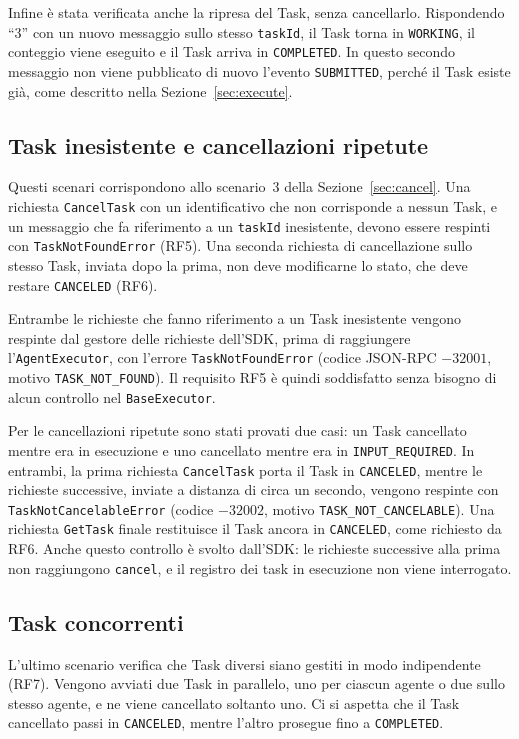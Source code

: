 Infine è stata verificata anche la ripresa del Task, senza cancellarlo. Rispondendo ``3'' con un nuovo messaggio sullo stesso \texttt{taskId}, il Task torna in \texttt{WORKING}, il conteggio viene eseguito e il Task arriva in \texttt{COMPLETED}. In questo secondo messaggio non viene pubblicato di nuovo l'evento \texttt{SUBMITTED}, perché il Task esiste già, come descritto nella Sezione~\ref{sec:execute}.

\subsection{Task inesistente e cancellazioni ripetute}

Questi scenari corrispondono allo scenario~3 della Sezione~\ref{sec:cancel}. Una richiesta \texttt{CancelTask} con un identificativo che non corrisponde a nessun Task, e un messaggio che fa riferimento a un \texttt{taskId} inesistente, devono essere respinti con \texttt{TaskNotFoundError} (RF5). Una seconda richiesta di cancellazione sullo stesso Task, inviata dopo la prima, non deve modificarne lo stato, che deve restare \texttt{CANCELED} (RF6).

Entrambe le richieste che fanno riferimento a un Task inesistente vengono respinte dal gestore delle richieste dell'SDK, prima di raggiungere l'\texttt{AgentExecutor}, con l'errore \texttt{TaskNotFoundError} (codice JSON-RPC $-32001$, motivo \texttt{TASK\_NOT\_FOUND}). Il requisito RF5 è quindi soddisfatto senza bisogno di alcun controllo nel \texttt{BaseExecutor}.

Per le cancellazioni ripetute sono stati provati due casi: un Task cancellato mentre era in esecuzione e uno cancellato mentre era in \texttt{INPUT\_REQUIRED}. In entrambi, la prima richiesta \texttt{CancelTask} porta il Task in \texttt{CANCELED}, mentre le richieste successive, inviate a distanza di circa un secondo, vengono respinte con \texttt{TaskNotCancelableError} (codice $-32002$, motivo \texttt{TASK\_NOT\_CANCELABLE}). Una richiesta \texttt{GetTask} finale restituisce il Task ancora in \texttt{CANCELED}, come richiesto da RF6. Anche questo controllo è svolto dall'SDK: le richieste successive alla prima non raggiungono \texttt{cancel}, e il registro dei task in esecuzione non viene interrogato.

\subsection{Task concorrenti}

L'ultimo scenario verifica che Task diversi siano gestiti in modo indipendente (RF7). Vengono avviati due Task in parallelo, uno per ciascun agente o due sullo stesso agente, e ne viene cancellato soltanto uno. Ci si aspetta che il Task cancellato passi in \texttt{CANCELED}, mentre l'altro prosegue fino a \texttt{COMPLETED}.

